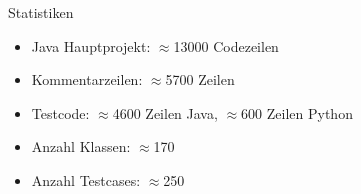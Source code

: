 \documentclass[18pt]{beamer}
\begin{document}
	\begin{frame}{Statistiken}
		\begin{itemize}
			\item Java Hauptprojekt: $\approx$13000 Codezeilen
			\item Kommentarzeilen: $\approx$5700 Zeilen
			\item Testcode: $\approx$4600 Zeilen Java, $\approx$600 Zeilen Python
			\item Anzahl Klassen: $\approx$170
			\item Anzahl Testcases: $\approx$250
		\end{itemize}
	\end{frame}

\end{document}
